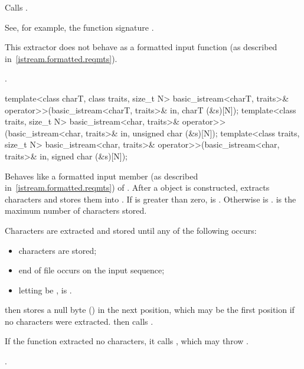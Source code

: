 \begin{itemdescr}
\pnum
\effects
Calls
.
\begin{footnote}
See, for example, the function signature
.
\end{footnote}
This extractor does not behave as a formatted input function
(as described in~\ref{istream.formatted.reqmts}).

\pnum
\returns
{}.
\end{itemdescr}

%
\begin{itemdecl}
template<class charT, class traits, size_t N>
  basic_istream<charT, traits>& operator>>(basic_istream<charT, traits>& in, charT (&s)[N]);
template<class traits, size_t N>
  basic_istream<char, traits>& operator>>(basic_istream<char, traits>& in, unsigned char (&s)[N]);
template<class traits, size_t N>
  basic_istream<char, traits>& operator>>(basic_istream<char, traits>& in, signed char (&s)[N]);
\end{itemdecl}

\begin{itemdescr}
\pnum
\effects
Behaves like a formatted input member (as described in~\ref{istream.formatted.reqmts})
of .
After a
object is constructed,
extracts characters and stores them into
.
If
is greater than zero,  is
.
Otherwise  is .
 is the maximum number of characters stored.

\pnum
Characters are extracted and stored until any of the following occurs:
\begin{itemize}
\item {} characters are stored;
\item end of file occurs on the input sequence;
\item letting  be ,
 is .
\end{itemize}

\pnum
{}
then stores a null byte
()
in the next position, which may be the first position if no characters
were extracted.
then calls
.

\pnum
If the function extracted no characters, it calls
,
which may throw
.

\pnum
\returns
{}.
\end{itemdescr}

